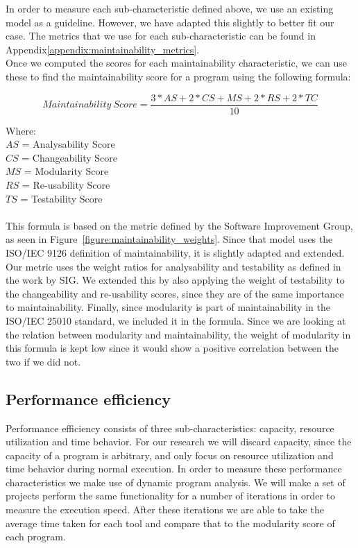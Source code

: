 \documentclass[twoside]{uva-inf-bachelor-thesis}
\begin{document}
In order to measure each sub-characteristic defined above, we use an existing model\cite{heitlager2016practical} as a guideline. However, we have adapted this slightly to better fit our case. The metrics that we use for each sub-characteristic can be found in Appendix\ref{appendix:maintainability_metrics}.\\

Once we computed the scores for each maintainability characteristic, we can use these to find the maintainability score for a program using the following formula:

\[ Maintainability\ Score = \dfrac{3 * AS + 2 * CS + MS + 2 * RS + 2 * TC}{10} \]

Where:\\
$AS$ = Analysability Score\\
$CS$ = Changeability Score\\
$MS$ = Modularity Score\\
$RS$ = Re-usability Score\\
$TS$ = Testability Score\\
\\
This formula is based on the metric defined by the Software Improvement Group, as seen in Figure~\ref{figure:maintainability_weights}. Since that model uses the ISO/IEC 9126 definition of maintainability, it is slightly adapted and extended. Our metric uses the weight ratios for analysability and testability as defined in the work by SIG. We extended this by also applying the weight of testability to the changeability and re-usability scores, since they are of the same importance to maintainability. Finally, since modularity is part of maintainability in the ISO/IEC 25010 standard, we included it in the formula. Since we are looking at the relation between modularity and maintainability, the weight of modularity in this formula is kept low since it would show a positive correlation between the two if we did not.

\subsection{Performance efficiency}
\label{method:performance}
Performance efficiency consists of three sub-characteristics: capacity, resource utilization and time behavior. For our research we will discard capacity, since the capacity of a program is arbitrary, and only focus on resource utilization and time behavior during normal execution. In order to measure these performance characteristics we make use of dynamic program analysis. We will make a set of projects perform the same functionality for a number of iterations in order to measure the execution speed. After these iterations we are able to take the average time taken for each tool and compare that to the modularity score of each program.\\
\end{document}
